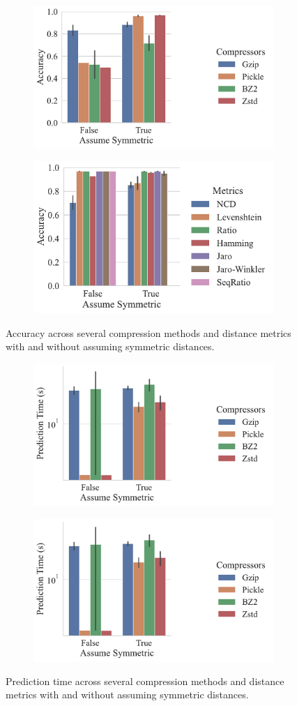 \documentclass[sigconf]{acmart}
\begin{document}
\begin{figure}
    \begin{subfigure}
        \centering
        \includegraphics[width=.36\textwidth]{figs/truthseeker/symmetric_vs_compressor.pdf}
    \end{subfigure}
    \begin{subfigure}
        \centering
        \includegraphics[width=.36\textwidth]{figs/truthseeker/symmetric_vs_metric.pdf}
    \end{subfigure}
    \caption{Accuracy across several compression methods and distance metrics with and without assuming symmetric distances.}
    \label{fig:symmetry}
\end{figure}

\begin{figure}
    \begin{subfigure}
        \centering
        \includegraphics[width=.36\textwidth]{figs/truthseeker/symmetric_vs_compressor_predict_time.pdf}
    \end{subfigure}
    \begin{subfigure}
        \centering
        \includegraphics[width=.36\textwidth]{figs/truthseeker/symmetric_vs_compressor_predict_time.pdf}
    \end{subfigure}
    \caption{Prediction time across several compression methods and distance metrics with and without assuming symmetric distances.}
    \label{fig:symmetry_time}
\end{figure}
\end{document}
